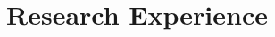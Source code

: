 \documentclass[a4paper,12pt]{article}
\begin{document}


\section{Research Experience}
\end{document}
